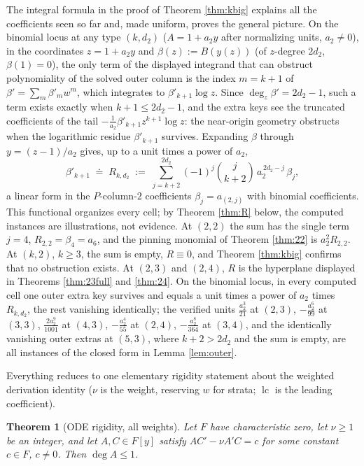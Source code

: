 \documentclass[11pt]{article}
\newtheorem{theorem}{Theorem}[section]
\theoremstyle{definition}
\theoremstyle{remark}
\begin{document}
The integral formula in the proof of Theorem \ref{thm:kbig} explains all the coefficients seen so far and, made uniform, proves the general picture. On the binomial locus at any type $(k,d_2)$ ($A=1+a_2y$ after normalizing units, $a_2\neq0$), in the coordinates $z=1+a_2y$ and $\beta(z):=B(y(z))$ (of $z$-degree $2d_2$, $\beta(1)=0$), the only term of the displayed integrand that can obstruct polynomiality of the solved outer column is the index $m=k+1$ of $\beta'=\sum_m\beta'_mw^m$, which integrates to $\beta'_{k+1}\log z$. Since $\deg_z\beta'=2d_2-1$, such a term exists exactly when $k+1\leq 2d_2-1$, and the extra keys see the truncated coefficients of the tail $-\frac{1}{a_2}\beta'_{k+1}z^{k+1}\log z$: the near-origin geometry obstructs when the logarithmic residue $\beta'_{k+1}$ survives. Expanding $\beta$ through $y=(z-1)/a_2$ gives, up to a unit times a power of $a_2$,
\[
\beta'_{k+1}\;\doteq\;R_{k,d_2}\;:=\;\sum_{j=k+2}^{2d_2}(-1)^j\binom{j}{k+2}\,a_2^{\,2d_2-j}\,\beta_j ,
\]
a linear form in the $P$-column-$2$ coefficients $\beta_j=a_{(2,j)}$ with binomial coefficients. This functional organizes every cell; by Theorem \ref{thm:R} below, the computed instances are illustrations, not evidence. At $(2,2)$ the sum has the single term $j=4$, $R_{2,2}=\beta_4=a_6$, and the pinning monomial of Theorem \ref{thm:22} is $a_2^2R_{2,2}$. At $(k,2)$, $k\geq3$, the sum is empty, $R\equiv0$, and Theorem \ref{thm:kbig} confirms that no obstruction exists. At $(2,3)$ and $(2,4)$, $R$ is the hyperplane displayed in Theorems \ref{thm:23full} and \ref{thm:24}. On the binomial locus, in every computed cell one outer extra key survives and equals a unit times a power of $a_2$ times $R_{k,d_2}$, the rest vanishing identically; the verified units $\frac{a_2^3}{21}$ at $(2,3)$, $-\frac{a_2^6}{99}$ at $(3,3)$, $\frac{2a_2^9}{1001}$ at $(4,3)$, $-\frac{a_2^4}{55}$ at $(2,4)$, $-\frac{a_2^8}{364}$ at $(3,4)$, and the identically vanishing outer extras at $(5,3)$, where $k+2>2d_2$ and the sum is empty, are all instances of the closed form in Lemma \ref{lem:outer}.

Everything reduces to one elementary rigidity statement about the weighted derivation identity ($\nu$ is the weight, reserving $w$ for strata; $\operatorname{lc}$ is the leading coefficient).

\begin{theorem}[ODE rigidity, all weights]\label{thm:ode}
Let $F$ have characteristic zero, let $\nu\geq1$ be an integer, and let $A,C\in F[y]$ satisfy $AC'-\nu A'C=c$ for some constant $c\in F$, $c\neq0$. Then $\deg A\leq 1$.
\end{theorem}
\end{document}
